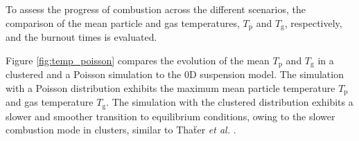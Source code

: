 \documentclass[times,twocolumn,final]{elsarticle}
\newcommand{\mrm}[1]{\mathrm{#1}}
\newcommand{\St}{\mathrm{St}}
\newcommand{\Rel}{\mathrm{Re}_\lambda}
\newcommand{\YO}{Y_\mathrm{O_2}}
\begin{document}
To assess the progress of combustion across the different scenarios, the comparison of the mean particle and gas temperatures, $T_\mrm{p}$ and $T_\mrm{g}$, respectively, and the burnout times is evaluated.

    
    

Figure \ref{fig:temp_poisson} compares the evolution of the mean $T_\mrm{p}$ and $T_\mrm{g}$ in a clustered and a Poisson simulation to the 0D suspension model. The simulation with a Poisson distribution exhibits the maximum mean particle temperature $T_\mrm{p}$ and gas temperature $T_\mrm{g}$. The simulation with the clustered distribution exhibits a slower and smoother transition to equilibrium conditions, owing to the slower combustion mode in clusters, similar to Tha\"ter \emph{et al.} \cite{thater2026interaction}.
\end{document}

